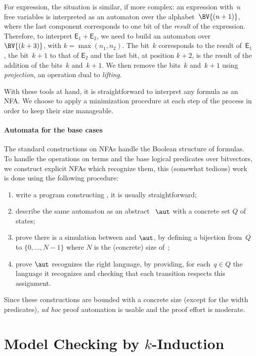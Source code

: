 For expression, the situation is similar, if more complex: an expression
with~$n$ free variables is interpreted as an automaton over the
alphabet~$\BV{(n+1)}$, where the last component corresponds to one bit of the
\emph{result} of the expression.
%
Therefore, to interpret $\mathsf E_1 + \mathsf E_2$, we need to build an
automaton over~$\BV{(k+3)}$, with $k = \max(n_1, n_2)$.
%
The bit~$k$ corresponds to the result of~$\mathsf E_1$, the bit~$k+1$ to that of
$\mathsf E_2$ and the last bit, at position $k+2$, is the result of the addition
of the bits~$k$ and~$k+1$.
%
We then remove the bits~$k$ and~$k+1$ using \emph{projection}, an operation dual
to \emph{lifting}.

With these tools at hand, it is straightforward to interpret any formula as an
NFA. We choose to apply a minimization procedure at each step of the process
in order to keep their size manageable.

\paragraph{Automata for the base cases}

The standard constructions on NFAs handle the Boolean structure of formulas.
%
To handle the operations on terms and the base logical predicates over
bitvectors, we construct explicit NFAs which recognize them, this (somewhat
tedious) work is done using the following procedure:
\begin{enumerate}
  \item write a program constructing , it is usually
    straightforward;
  \item describe the same automaton as an abstract ~$\aut$ with
    a concrete set $Q$ of states;
  \item prove there is a simulation between  and $\aut$, by
    defining a bijection from~$Q$ to $\{0, ..., N-1\}$ where $N$ is the
    (concrete) size of~;
  \item prove $\aut$ recognizes the right language, by providing, for each~$q
    \in Q$ the language it recognizes and checking that each transition respects
    this assignment.
\end{enumerate}
%
Since these constructions are bounded with a concrete size (except for the width
predicates), \emph{ad hoc} proof automation is usable and the proof effort is
moderate.

\section{Model Checking by \texorpdfstring{$k$}{k}-Induction}
\label{sec:swbv:kinduction}

